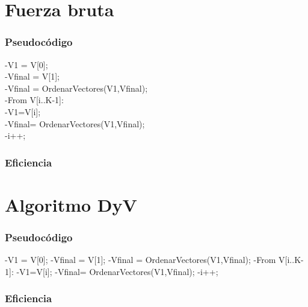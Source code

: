 \documentclass{beamer}
\begin{document}
\section{Fuerza bruta} %
\begin{frame}
	\frametitle{Pseudocódigo}
		-V1 = V[0]; \\
		
		-Vfinal = V[1];\\
		
		-Vfinal = OrdenarVectores(V1,Vfinal);\\
		
		-From V[i..K-1]:\\
		
			-V1=V[i];\\
			
			-Vfinal= OrdenarVectores(V1,Vfinal);\\
			
			-i++;\\
			
	
\end{frame}

\begin{frame}
	\frametitle{Eficiencia}

	
\end{frame}

\section{Algoritmo DyV} %
\begin{frame}
	\frametitle{Pseudocódigo}
	-V1 = V[0];
	-Vfinal = V[1];
	-Vfinal = OrdenarVectores(V1,Vfinal);
	-From V[i..K-1]:
	-V1=V[i];
	-Vfinal= OrdenarVectores(V1,Vfinal);
	-i++;
	
\end{frame}

\begin{frame}
	\frametitle{Eficiencia}
	
	
\end{frame}
\end{document}
